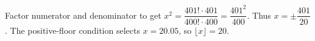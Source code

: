 Factor numerator and denominator to get $x^2=\dfrac{401!\cdot 401}{400!\cdot 400}=\dfrac{401^2}{400}$. Thus $x=\pm\dfrac{401}{20}$. The positive-floor condition selects $x=20.05$, so $\boxed{\lfloor x\rfloor=20}$.
